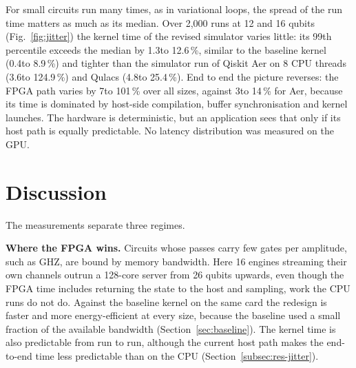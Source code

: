 \documentclass[pdflatex,sn-mathphys-num]{sn-jnl}
\newcommand{\NumJitterAerSpreadMax}{14}
\newcommand{\NumJitterAerSpreadMin}{3}
\newcommand{\NumJitterKAerSpreadMax}{124.9}
\newcommand{\NumJitterKAerSpreadMin}{3.6}
\newcommand{\NumJitterKQulacsSpreadMax}{25.4}
\newcommand{\NumJitterKQulacsSpreadMin}{4.8}
\newcommand{\NumJitterKSvSpreadMax}{12.6}
\newcommand{\NumJitterKSvSpreadMin}{1.3}
\newcommand{\NumJitterKVsevenSpreadMax}{8.9}
\newcommand{\NumJitterKVsevenSpreadMin}{0.4}
\newcommand{\NumJitterSvSpreadMax}{101}
\newcommand{\NumJitterSvSpreadMin}{7}
\newcommand{\NumXplatGhzCrossN}{26}
\theoremstyle{thmstyleone}
\theoremstyle{thmstylethree}
\begin{document}
For small circuits run many times, as in variational loops, the spread of the run time matters as much as its median. Over 2{,}000 runs at 12 and 16 qubits (Fig.~\ref{fig:jitter}) the kernel time of the revised simulator varies little: its 99th percentile exceeds the median by \NumJitterKSvSpreadMin to \NumJitterKSvSpreadMax\,\%, similar to the baseline kernel (\NumJitterKVsevenSpreadMin to \NumJitterKVsevenSpreadMax\,\%) and tighter than the simulator run of Qiskit Aer on 8 CPU threads (\NumJitterKAerSpreadMin to \NumJitterKAerSpreadMax\,\%) and Qulacs (\NumJitterKQulacsSpreadMin to \NumJitterKQulacsSpreadMax\,\%). End to end the picture reverses: the FPGA path varies by \NumJitterSvSpreadMin to \NumJitterSvSpreadMax\,\% over all sizes, against \NumJitterAerSpreadMin to \NumJitterAerSpreadMax\,\% for Aer, because its time is dominated by host-side compilation, buffer synchronisation and kernel launches. The hardware is deterministic, but an application sees that only if its host path is equally predictable. No latency
distribution was measured on the GPU.
\section{Discussion}\label{sec:discussion}

The measurements separate three regimes.

\textbf{Where the FPGA wins.} Circuits whose passes carry few gates per amplitude, such as GHZ, are bound by memory bandwidth. Here 16 engines streaming their own channels outrun a 128-core server from \NumXplatGhzCrossN{} qubits upwards, even though the FPGA time includes returning the state to the host and sampling, work the CPU runs do not do. Against the baseline kernel on the same card the redesign is faster and more energy-efficient at every size, because the baseline used a small fraction of the available bandwidth (Section~\ref{sec:baseline}). The kernel time is also predictable from run to run, although the current host path makes the end-to-end time less predictable than on the CPU (Section~\ref{subsec:res-jitter}).
\end{document}

